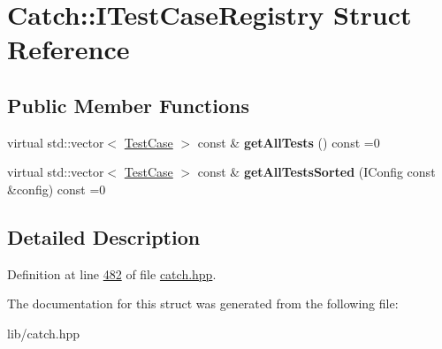 \hypertarget{structCatch_1_1ITestCaseRegistry}{}\section{Catch\+::I\+Test\+Case\+Registry Struct Reference}
\label{structCatch_1_1ITestCaseRegistry}
\subsection*{Public Member Functions}
\begin{DoxyCompactItemize}
\item 
\mbox{\label{structCatch_1_1ITestCaseRegistry_ad6e4d4a621655123f73ae98cfeda063d}} 
virtual std\+::vector$<$ \mbox{\hyperlink{classCatch_1_1TestCase}{Test\+Case}} $>$ const  \& {\bfseries get\+All\+Tests} () const =0
\item 
\mbox{\label{structCatch_1_1ITestCaseRegistry_a33e46639d0319d35497c05bb5d02be5a}} 
virtual std\+::vector$<$ \mbox{\hyperlink{classCatch_1_1TestCase}{Test\+Case}} $>$ const  \& {\bfseries get\+All\+Tests\+Sorted} (I\+Config const \&config) const =0
\end{DoxyCompactItemize}


\subsection{Detailed Description}


Definition at line \mbox{\hyperlink{catch_8hpp_source_l00482}{482}} of file \mbox{\hyperlink{catch_8hpp_source}{catch.\+hpp}}.



The documentation for this struct was generated from the following file\+:\begin{DoxyCompactItemize}
\item 
lib/catch.\+hpp\end{DoxyCompactItemize}
